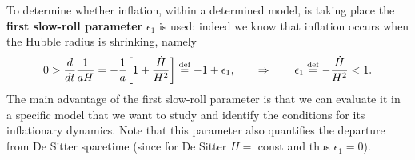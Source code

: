 To determine whether inflation, within a determined model, is taking place the \textbf{first slow-roll parameter} $\epsilon_1$ is used: indeed we know that inflation occurs when the Hubble radius is shrinking, namely
\begin{equation}
    \label{eq:First_SR_paramteter}
    0>\frac{d}{dt}\frac{1}{aH}=-\frac{1}{a}\bigg[1+\frac{\dot H}{H^2}\bigg]\stackrel{\text{def}}{=}-1+\epsilon_1,\qquad\Rightarrow\qquad\epsilon_1\stackrel{\text{def}}{=}-\frac{\dot H}{H^2}<1.
\end{equation}
The main advantage of the first slow-roll parameter is that we can evaluate it in a specific model that we want to study and identify the conditions for its inflationary dynamics. Note that this parameter also quantifies the departure from De Sitter spacetime (since for De Sitter $H=$ const and thus $\epsilon_1=0$).

